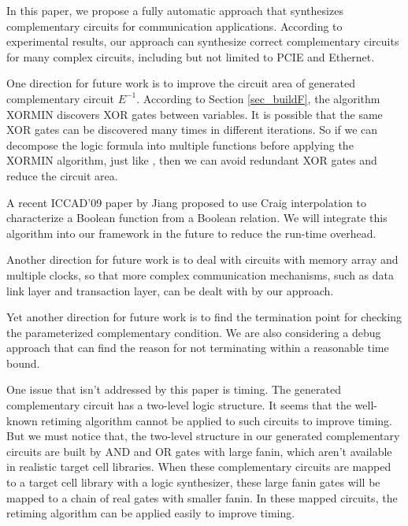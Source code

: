 \documentclass[journal]{IEEEtran}
\begin{document}
In this paper,
we propose a fully automatic approach that synthesizes complementary circuits for communication applications.
According to experimental results,
our approach can synthesize correct complementary circuits for many complex circuits, including but not limited to PCIE and Ethernet.

One direction for future work is to improve the circuit area of generated complementary circuit $E^{-1}$.
According to Section \ref{sec_buildF},
the algorithm XORMIN discovers XOR gates between variables.
It is possible that the same XOR gates can be discovered many times in different iterations.
So if we can decompose the logic formula into multiple functions before applying the XORMIN algorithm,
just like \cite{FuncXOR},
then we can avoid redundant XOR gates and reduce the circuit area.

A recent ICCAD'09 paper by Jiang\cite{IterpoFunc} proposed to use Craig interpolation to characterize a Boolean function from a Boolean relation. We will integrate this algorithm into our framework in the future to reduce the run-time overhead.

Another direction for future work is to deal with circuits with memory array and multiple clocks,
so that more complex communication mechanisms,
such as data link layer and transaction layer,
can be dealt with by our approach.

Yet another direction for future work is to find the termination point for checking the parameterized complementary condition.
We are also considering a debug approach that can find the reason for not terminating within a reasonable time bound.

One issue that isn't addressed by this paper is timing.
The generated complementary circuit has a two-level logic structure.
It seems that the well-known retiming algorithm \cite{Retiming} cannot be applied to such circuits to improve timing.
But we must notice that,
the two-level structure in our generated complementary circuits are built by AND and OR gates with large fanin,
which aren't available in realistic target cell libraries.
When these complementary circuits are mapped to a target cell library with a logic synthesizer,
these large fanin gates will be mapped to a chain of real gates with smaller fanin.
In these mapped circuits,
the retiming algorithm can be applied easily to improve timing.
\end{document}
